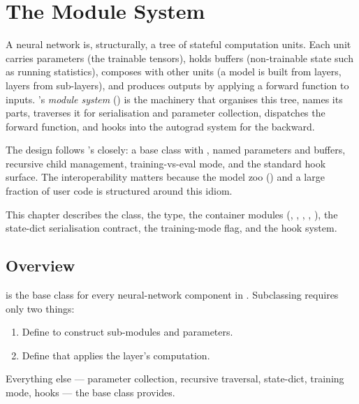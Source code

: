 \chapter{The Module System}
\label{ch:module_system}

A neural network is, structurally, a tree of stateful computation
units. Each unit carries parameters (the trainable tensors), holds
buffers (non-trainable state such as running statistics), composes
with other units (a model is built from layers, layers from
sub-layers), and produces outputs by applying a forward function to
inputs. \Lucid's \emph{module system} () is the
machinery that organises this tree, names its parts, traverses it
for serialisation and parameter collection, dispatches the forward
function, and hooks into the autograd system for the backward.

The design follows 's  closely: a
 base class with , named parameters and
buffers, recursive child management, training-vs-eval mode, and
the standard hook surface. The interoperability matters because
the model zoo () and a large fraction of
user code is structured around this idiom.

This chapter describes the  class, the 
type, the container modules (, ,
, , ),
the state-dict serialisation contract, the training-mode flag, and
the hook system.

\section{Overview}
\label{sec:module_system:overview}

 is the base class for every neural-network
component in \Lucid. Subclassing requires only two things:

\begin{enumerate}
  \item Define  to construct sub-modules
    and parameters.
  \item Define  that applies the layer's
    computation.
\end{enumerate}

Everything else --- parameter collection, recursive traversal,
state-dict, training mode, hooks --- the base class provides.

